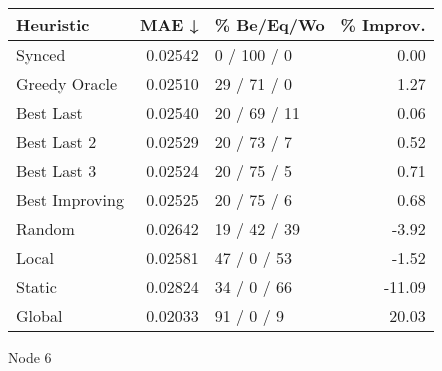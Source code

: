 \begin{tabular}{lrlr}
\toprule
\textbf{Heuristic} & \textbf{MAE ↓} & \textbf{\% Be/Eq/Wo} & \textbf{\% Improv.} \\
\midrule
            Synced &        0.02542 &          0 / 100 / 0 &                0.00 \\
     Greedy Oracle &        0.02510 &          29 / 71 / 0 &                1.27 \\
         Best Last &        0.02540 &         20 / 69 / 11 &                0.06 \\
       Best Last 2 &        0.02529 &          20 / 73 / 7 &                0.52 \\
       Best Last 3 &        0.02524 &          20 / 75 / 5 &                0.71 \\
    Best Improving &        0.02525 &          20 / 75 / 6 &                0.68 \\
            Random &        0.02642 &         19 / 42 / 39 &               -3.92 \\
             Local &        0.02581 &          47 / 0 / 53 &               -1.52 \\
            Static &        0.02824 &          34 / 0 / 66 &              -11.09 \\
            Global &        0.02033 &           91 / 0 / 9 &               20.03 \\
\bottomrule
\end{tabular}
\caption{Node 6}
\label{tab:iid_lr05_le1_bs4_6}
